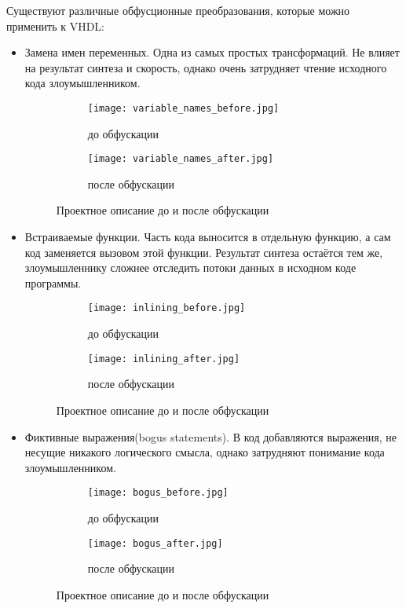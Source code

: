 Существуют различные обфусционные преобразования, которые можно применить к VHDL:
\begin{itemize}
\item Замена имен переменных. Одна из самых простых трансформаций. Не влияет на результат синтеза и скорость, однако очень затрудняет чтение исходного кода злоумышленником.
\begin{figure}[ht]
\centering
  \begin{subfigure}[b]{0.45\textwidth}
    \centering
    \texttt{[image: variable\_names\_before.jpg]}
    \caption*{ до обфускации }
  \end{subfigure}
  \begin{subfigure}[b]{0.45\textwidth}
    \centering
    \texttt{[image: variable\_names\_after.jpg]}
    \caption*{ после обфускации }
  \end{subfigure}
  \caption{ Проектное описание до и после обфускации }
  \label{fig:fire_alarms}
\end{figure}

\item Встраиваемые функции. Часть кода выносится в отдельную функцию, а сам код заменяется вызовом этой функции. Результат синтеза остаётся тем же, злоумышленнику сложнее отследить потоки данных в исходном коде программы.


\begin{figure}[ht]
\centering
  \begin{subfigure}[b]{0.45\textwidth}
    \centering
    \texttt{[image: inlining\_before.jpg]}
    \caption*{до обфускации}
  \end{subfigure}
  \begin{subfigure}[b]{0.45\textwidth}
    \centering
    \texttt{[image: inlining\_after.jpg]}
    \caption*{после обфускации}
  \end{subfigure}
  \caption{ Проектное описание до и после обфускации }
  \label{fig:fire_alarms}
\end{figure}

\item Фиктивные выражения(bogus statements). В код добавляются выражения, не несущие никакого  логического смысла, однако затрудняют понимание кода злоумышленником.


\begin{figure}[ht]
\centering
  \begin{subfigure}[b]{0.45\textwidth}
    \centering
    \texttt{[image: bogus\_before.jpg]}
    \caption*{до обфускации}
  \end{subfigure}
  \begin{subfigure}[b]{0.45\textwidth}
    \centering
    \texttt{[image: bogus\_after.jpg]}
    \caption*{после обфускации}
  \end{subfigure}
  \caption{ Проектное описание до и после обфускации }
  \label{fig:fire_alarms}
\end{figure}



\end{itemize}
